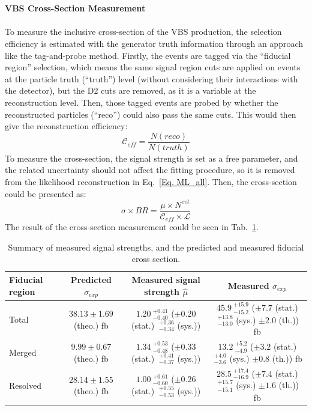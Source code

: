 \\
\\{\bf VBS Cross-Section Measurement}
\\
\\To measure the inclusive cross-section of the VBS production, the selection efficiency is estimated with the generator truth information through an approach like the tag-and-probe method. Firstly, the events are tagged via the ``fiducial region'' selection, which means the same signal region cuts are applied on events at the particle truth (``truth'') level (without considering their interactions with the detector), but the D2 cuts are removed, as it is a variable at the reconstruction level. Then, those tagged events are probed by whether the reconstructed particles (``reco'') could also pass the same cuts. This would then give the reconstruction efficiency:
\begin{equation}
\mathcal{C}_{eff} = \frac{N(reco)}{N(truth)} 
\end{equation}  
To measure the cross-section, the signal strength is set as a free parameter, and the related uncertainty should not affect the fitting procedure, so it is removed from the likelihood reconstruction in Eq.~\ref{Eq. ML_all}. Then, the cross-section could be presented as:
\begin{equation}
\sigma\times BR=\frac{\mu\times N^{evt}}{\mathcal{C}_{eff}\times\mathcal{L}}
\end{equation}
The result of the cross-section measurement could be seen in Tab.~\ref{tab:obs_mu_fidxs}.
\begin{table}[htb] 
	\centering
	\scriptsize
	\begin{tabular}{lccc}
		\hline
		Fiducial region  & Predicted $\sigma_{exp}$ & Measured signal strength $\hat{\mu}$ & Measured $\sigma_{exp}$ \\
		\hline
		Total    & $38.13 \pm 1.69 $ (theo.) fb & $1.20 ~^{+0.41}_{-0.40} $ ($ \pm 0.20$ (stat.) $~^{+0.36}_{-0.34}$ (sys.)) & $45.9 ~^{+15.9}_{-15.2} $ ($ \pm 7.7$ (stat.) $~^{+13.8}_{-13.0}$ (sys.) $\pm 2.0$ (th.)) fb \\
		Merged   & $9.99  \pm 0.67 $ (theo.) fb & $1.34 ~^{+0.53}_{-0.48} $ ($ \pm 0.33$ (stat.) $~^{+0.41}_{-0.37}$ (sys.)) & $13.2 ~^{+5.2}_{-4.9} $ ($ \pm 3.2$ (stat.) $~^{+4.0}_{-3.6}$ (sys.) $\pm 0.8$ (th.)) fb \\
		Resolved & $28.14 \pm 1.55 $ (theo.) fb & $1.00 ~^{+0.61}_{-0.60} $ ($ \pm 0.26$ (stat.) $~^{+0.55}_{-0.53}$ (sys.)) & $28.5 ~^{+17.4}_{-16.9} $ ($ \pm 7.4$ (stat.) $~^{+15.7}_{-15.1}$ (sys.) $\pm 1.6$ (th.)) fb \\
		\hline 
	\end{tabular}
	\caption{Summary of measured signal strengths, and the predicted and measured fiducial cross section.
	}
	\label{tab:obs_mu_fidxs}  
\end{table}